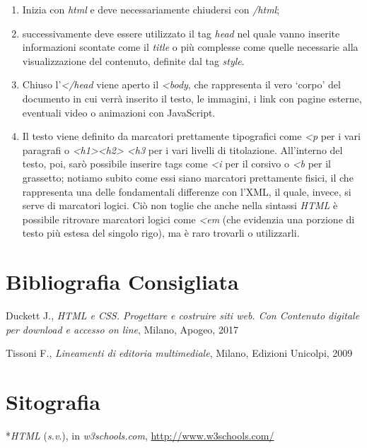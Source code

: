 {{\begin{enumerate}
\def\labelenumi{\arabic{enumi}.}
\item
  Inizia con \emph{html} e deve necessariamente
  chiudersi con \emph{/html};
\item
  successivamente deve essere utilizzato il tag
  \emph{head} nel quale vanno inserite
  informazioni scontate come il \emph{title} o
  più complesse come quelle necessarie alla visualizzazione del
  contenuto, definite dal tag \emph{style}.
\item
  Chiuso l'\emph{\textless{}/head} viene aperto il
  \emph{\textless{}body}, che rappresenta il vero `corpo'
  del documento in cui verrà inserito il testo, le immagini, i link con
  pagine esterne, eventuali video o animazioni con JavaScript.
\item
  Il testo viene definito da marcatori prettamente tipografici come
  \emph{\textless{}p} per i vari paragrafi o
  \emph{\textless{}h1\textgreater{}\textless{}h2\textgreater{}
  \textless{}h3} per i vari livelli di titolazione.
  All'interno del testo, poi, sarò possibile inserire tags come
  \emph{\textless{}i} per il corsivo o
  \emph{\textless{}b} per il grassetto; notiamo subito
  come essi siano marcatori prettamente fisici, il che rappresenta una
  delle fondamentali differenze con l'XML, il quale, invece, si serve di
  marcatori logici. Ciò non toglie che anche nella sintassi \emph{HTML}
  è possibile ritrovare marcatori logici come
  \emph{\textless{}em} (che evidenzia una porzione di
  testo più estesa del singolo rigo), ma è raro trovarli o utilizzarli.
\end{enumerate}

\section*{Bibliografia Consigliata}
{\parindent0pt 
Duckett J., \emph{HTML e CSS. Progettare e costruire siti web. Con
Contenuto digitale per download e accesso on line}, Milano, Apogeo, 2017

Tissoni F., \emph{Lineamenti di editoria multimediale}, Milano, Edizioni
Unicolpi, 2009
}

\section*{Sitografia}
{\parindent0pt 
*\emph{HTML} (\emph{s.v}.), in \emph{w3schools.com},
\url{http://www.w3schools.com/}
}


\hrulefill 
 
}}
